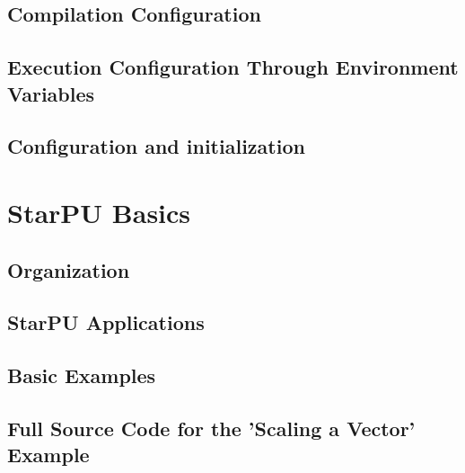 \chapter{Compilation Configuration}
\label{CompilationConfiguration}
\hypertarget{CompilationConfiguration}{}


\chapter{Execution Configuration Through Environment Variables}
\label{ExecutionConfigurationThroughEnvironmentVariables}
\hypertarget{ExecutionConfigurationThroughEnvironmentVariables}{}


\chapter{Configuration and initialization}
\label{ConfigurationAndInitialization}
\hypertarget{ConfigurationAndInitialization}{}


\part{StarPU Basics}

\chapter{Organization}
\label{IntroBasics}
\hypertarget{IntroBasics}{}


\chapter{StarPU Applications}
\label{StarPUApplications}
\hypertarget{StarPUApplications}{}


\chapter{Basic Examples}
\label{BasicExamples}
\hypertarget{BasicExamples}{}


\chapter{Full Source Code for the ’Scaling a Vector’ Example}
\label{FullSourceCodeVectorScal}
\hypertarget{FullSourceCodeVectorScal}{}


